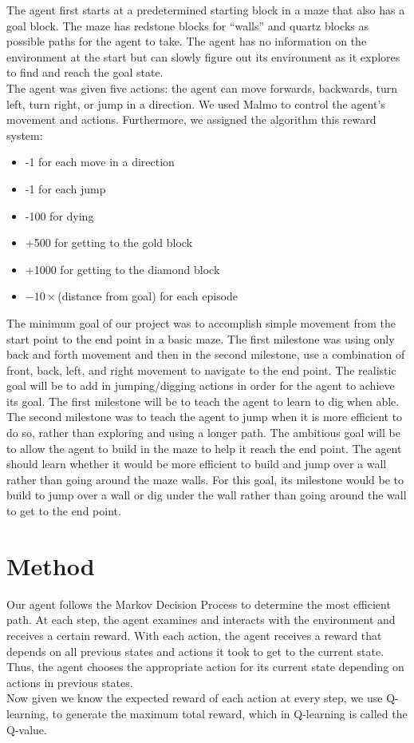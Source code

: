 \documentclass{article}
\begin{document}
The agent first starts at a predetermined starting block in a maze that also has a goal block. The maze has redstone blocks for “walls” and quartz blocks as possible paths for the agent to take. The agent has no information on the environment at the start but can slowly figure out its environment as it explores to find and reach the goal state. \\
The agent was given five actions: the agent can move forwards, backwards, turn left, turn right, or jump in a direction. We used Malmo to control the agent’s movement and actions. Furthermore, we assigned the algorithm this reward system:
\begin{itemize}
    \item -1 for each move in a direction
    \item -1 for each jump
    \item -100 for dying
    \item +500 for getting to the gold block
    \item +1000 for getting to the diamond block
    \item $-10  \times $(distance from goal) for each episode
\end{itemize}
The minimum goal of our project was to accomplish simple movement from the start point to the end point in a basic maze. The first milestone was using only back and forth movement and then in the second milestone, use a combination of front, back, left, and right movement to navigate to the end point. The realistic goal will be to add in jumping/digging actions in order for the agent to achieve its goal. The first milestone will be to teach the agent to learn to dig when able. The second milestone was to teach the agent to jump when it is more efficient to do so, rather than exploring and using a longer path. The ambitious goal will be to allow the agent to build in the maze to help it reach the end point. The agent should learn whether it would be more efficient to build and jump over a wall rather than going around the maze walls. For this goal, its milestone would be to build to jump over a wall or dig under the wall rather than going around the wall to get to the end point.

\section{Method}

Our agent follows the Markov Decision Process to determine the most efficient path. At each step, the agent examines and interacts with the environment and receives a certain reward. With each action, the agent receives a reward that depends on all previous states and actions it took to get to the current state. Thus, the agent chooses the appropriate action for its current state depending on actions in previous states. \\
Now given we know the expected reward of each action at every step, we use Q-learning, to generate the maximum total reward, which in Q-learning is called the Q-value. 
\end{document}
